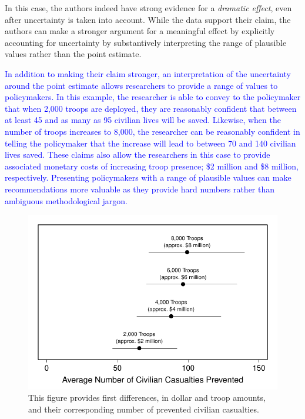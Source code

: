 \documentclass[12pt]{article}
\newcommand{\kelly}[1]{\textcolor{blue}{#1}}
\begin{document}
In this case, the authors indeed have strong evidence for a \emph{dramatic effect}, even after uncertainty is taken into account. While the data support their claim, the authors can make a stronger argument for a meaningful effect by explicitly accounting for uncertainty by substantively interpreting the range of plausible values rather than the point estimate. 

\kelly{In addition to making their claim stronger, an interpretation of the uncertainty around the point estimate allows researchers to provide a range of values to policymakers. In this example, the researcher is able to convey to the policymaker that when 2,000 troops are deployed, they are reasonably confident that between at least 45 and as many as 95 civilian lives will be saved. Likewise, when the number of troops increases to 8,000, the researcher can be reasonably confident in telling the policymaker that the increase will lead to between 70 and 140 civilian lives saved. These claims also allow the researchers in this case to provide associated monetary costs of increasing troop presence; \$2 million and \$8 million, respectively. Presenting policymakers with a range of plausible values can make recommendations more valuable as they provide hard numbers rather than ambiguous methodological jargon.}

\begin{figure}[H]
\begin{center}
\includegraphics[scale = .8]{figs/hks-ci.pdf}
\caption{This figure provides first differences, in dollar and troop amounts, and their corresponding number of prevented civilian casualties.}\label{fig:hks-ci}
\end{center}
\end{figure}
\end{document}

